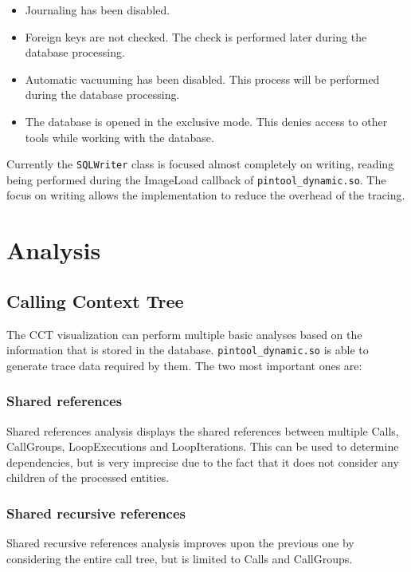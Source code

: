 \begin{itemize}
	\item Journaling has been disabled.
	\item Foreign keys are not checked. The check is performed later during the database processing.
	\item Automatic vacuuming has been disabled. This process will be performed during the database processing.
	\item The database is opened in the exclusive mode. This denies access to other tools while working with the database.
\end{itemize}

Currently the \texttt{SQLWriter} class is focused almost completely on writing, reading being performed during the ImageLoad callback of \texttt{pintool\_dynamic.so}. The focus on writing allows the implementation to reduce the overhead of the tracing.

\section{Analysis}

\subsection{Calling Context Tree}

The CCT visualization can perform multiple basic analyses based on the information that is stored in the database. \texttt{pintool\_dynamic.so} is able to generate trace data required by them. The two most important ones are:

\subsubsection{Shared references}

Shared references analysis displays the shared references between multiple Calls, CallGroups, LoopExecutions and LoopIterations. This can be used to determine dependencies, but is very imprecise due to the fact that it does not consider any children of the processed entities.

\subsubsection{Shared recursive references}

Shared recursive references analysis improves upon the previous one by considering the entire call tree, but is limited to Calls and CallGroups.

